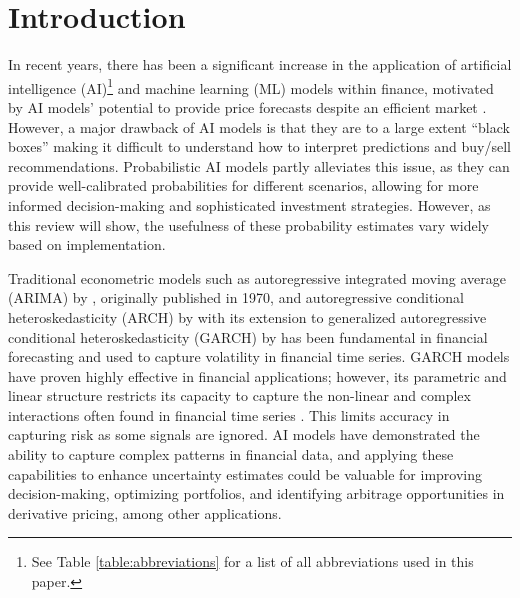 \section{Introduction}
\label{sec:introduction}
In recent years, there has been a significant increase in the application of artificial intelligence (AI)\footnote{See Table \ref{table:abbreviations} for a list of all abbreviations used in this paper.
} and machine learning (ML) models within finance, motivated by AI models' potential to provide price forecasts despite an efficient market \parencite{sezer2020financial}. However, a major drawback of AI models is that they are to a large extent ``black boxes'' making it difficult to understand how to interpret predictions and buy/sell recommendations. Probabilistic AI models partly alleviates this issue, as they can provide well-calibrated probabilities for different scenarios, allowing for more informed decision-making and sophisticated investment strategies. However, as this review will show, the usefulness of these probability estimates vary widely based on implementation.

Traditional econometric models such as autoregressive integrated moving average (ARIMA) by \textcite{boxJenkins2016time}, originally published in 1970, and autoregressive conditional heteroskedasticity (ARCH) by \textcite{Engle1982ARCH} with its extension to generalized autoregressive conditional heteroskedasticity (GARCH) by \textcite{BOLLERSLEV1986GARCH} has been fundamental in financial forecasting and used to capture volatility in financial time series. GARCH models have proven highly effective in financial applications; however, its parametric and linear structure restricts its capacity to capture the non-linear and complex interactions often found in financial time series \parencite{sezer2020financial}. This limits accuracy in capturing risk as some signals are ignored. AI models have demonstrated the ability to capture complex patterns in financial data, and applying these capabilities to enhance uncertainty estimates could be valuable for improving decision-making, optimizing portfolios, and identifying arbitrage opportunities in derivative pricing, among other applications.

